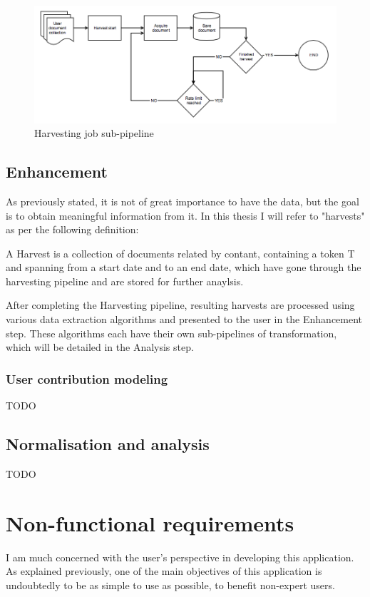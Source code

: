 \begin{figure}[ht]
    \centering
\includegraphics[width=\columnwidth]{img/harvestpipe.png}
    \caption{Harvesting job sub-pipeline}
    \label{fig:harvestpipe}
\end{figure}

\subsection{Enhancement}
As previously stated, it is not of great importance to have the data, but the goal is to obtain meaningful information from it. In this thesis I will refer to "harvests" as per the following definition:

\begin{definition}{}
A Harvest is a collection of documents related by contant, containing a token T and spanning from a start date and to an end date, which have gone through the harvesting pipeline and are stored for further anaylsis.
\end{definition}

After completing the Harvesting pipeline, resulting harvests are processed using various data extraction algorithms and presented to the user in the Enhancement step. These algorithms each have their own sub-pipelines of transformation, which will be detailed in the Analysis step.

\subsubsection{User contribution modeling}
{\color{red} TODO
}

\subsection{Normalisation and analysis}
{\color{red} TODO
}

\section{Non-functional requirements}
I am much concerned with the user's perspective in developing this application. As explained previously, one of the main objectives of this application is undoubtedly to be as simple to use as possible, to benefit non-expert users.

